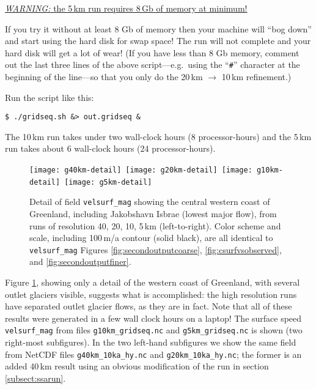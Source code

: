 \medskip
\centerline{\large\underline{\emph{WARNING:} the 5\,km run requires 8\,Gb of memory at minimum!}\normalsize}

\medskip
\noindent If you try it without at least 8 Gb of memory then your machine will ``bog down'' and start using the hard disk for swap space!  The run will not complete and your hard disk will get a lot of wear!  (If you have less than 8 Gb memory, comment out the last three lines of the above script---e.g.~using the ``\verb|#|'' character at the beginning of the line---so that you only do the 20\,km $\to$ 10\,km refinement.)

Run the script like this:
\begin{verbatim}
$ ./gridseq.sh &> out.gridseq &
\end{verbatim}
The 10\,km run takes under two wall-clock hours (8 processor-hours) and the 5\,km run takes about 6 wall-clock hours (24 processor-hours).

\begin{figure}[ht]
\centering
\mbox{\texttt{[image: g40km-detail]} \texttt{[image: g20km-detail]} \texttt{[image: g10km-detail]} \texttt{[image: g5km-detail]} }
\caption{Detail of field \texttt{velsurf_mag} showing the central western coast of Greenland, including Jakobshavn Isbrae (lowest major flow), from runs of resolution 40, 20, 10, 5\,km (left-to-right).  Color scheme and scale, including 100\,m/a contour (solid black), are all identical to \texttt{velsurf_mag} Figures \ref{fig:secondoutputcoarse}, \ref{fig:csurfvsobserved}, and \ref{fig:secondoutputfiner}.}
\label{fig:gridseqdetail}
\end{figure}

Figure \ref{fig:gridseqdetail}, showing only a detail of the western coast of Greenland, with several outlet glaciers visible, suggests what is accomplished: the high resolution runs have separated outlet glacier flows, as they are in fact.  Note that all of these results were generated in a few wall clock hours on a laptop!  The surface speed \texttt{velsurf_mag} from files \texttt{g10km_gridseq.nc} and \texttt{g5km_gridseq.nc} is shown (two right-most subfigures).  In the two left-hand subfigures we show the same field from NetCDF files \texttt{g40km_10ka_hy.nc} and \texttt{g20km_10ka_hy.nc}; the former is an added 40\,km result using an obvious modification of the run in section \ref{subsect:ssarun}.

